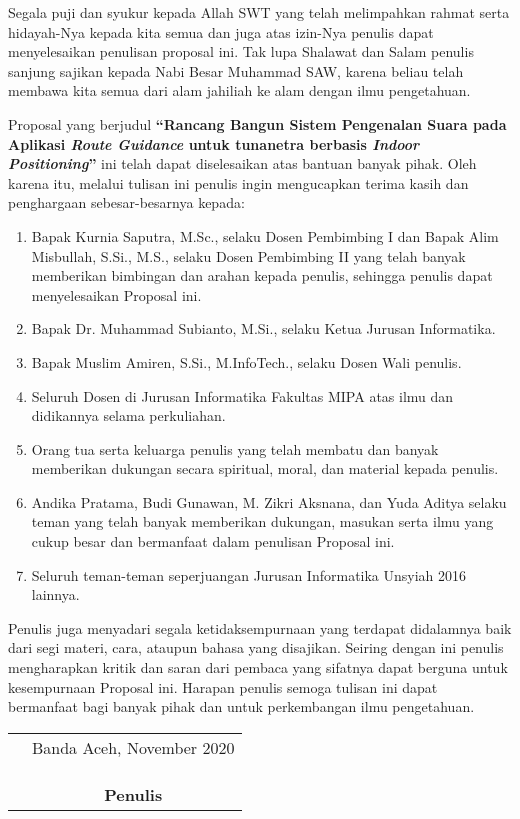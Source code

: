 \preface %


Segala puji dan syukur kepada Allah SWT yang telah melimpahkan rahmat serta hidayah-Nya kepada kita semua dan juga atas izin-Nya penulis dapat menyelesaikan penulisan proposal ini. Tak lupa Shalawat dan Salam penulis sanjung sajikan kepada Nabi Besar Muhammad SAW, karena beliau telah membawa kita semua dari alam jahiliah ke alam dengan ilmu pengetahuan.

Proposal yang berjudul \textbf{“Rancang Bangun Sistem Pengenalan Suara pada Aplikasi \textit{Route Guidance} untuk tunanetra berbasis \textit{Indoor Positioning}”} ini telah dapat diselesaikan atas bantuan banyak pihak. Oleh karena itu, melalui tulisan ini penulis ingin mengucapkan terima kasih dan penghargaan sebesar-besarnya kepada:

\begin{enumerate}
	\item{Bapak Kurnia Saputra, M.Sc., selaku Dosen Pembimbing I dan Bapak Alim Misbullah, S.Si., M.S., selaku Dosen Pembimbing II yang telah banyak memberikan bimbingan dan arahan kepada penulis, sehingga penulis dapat menyelesaikan Proposal ini.}
	\item {Bapak Dr. Muhammad Subianto, M.Si., selaku Ketua Jurusan Informatika.}
	\item {Bapak Muslim Amiren, S.Si., M.InfoTech., selaku Dosen Wali penulis.}
	\item {Seluruh Dosen di Jurusan Informatika Fakultas MIPA atas ilmu dan didikannya selama perkuliahan.}
	\item {Orang tua serta keluarga penulis yang telah membatu dan banyak memberikan dukungan secara spiritual, moral, dan material kepada penulis.}
	\item {Andika Pratama, Budi Gunawan, M. Zikri Aksnana, dan Yuda Aditya selaku teman yang telah banyak memberikan dukungan, masukan serta ilmu yang cukup besar dan bermanfaat dalam penulisan Proposal ini.}
	\item{Seluruh teman-teman seperjuangan Jurusan Informatika Unsyiah 2016 lainnya.}
\end{enumerate}


Penulis juga menyadari segala ketidaksempurnaan yang terdapat didalamnya baik dari segi materi, cara, ataupun bahasa yang disajikan. Seiring dengan ini penulis mengharapkan kritik dan saran dari pembaca yang sifatnya dapat berguna untuk kesempurnaan Proposal ini. Harapan penulis semoga tulisan ini dapat bermanfaat bagi banyak pihak dan untuk perkembangan ilmu pengetahuan.

\vspace{1cm}


\begin{tabular}{p{7.5cm}c}
	&Banda Aceh, November 2020\\
	&\\
	&\\
	&\\
	&\textbf{Penulis}
\end{tabular}